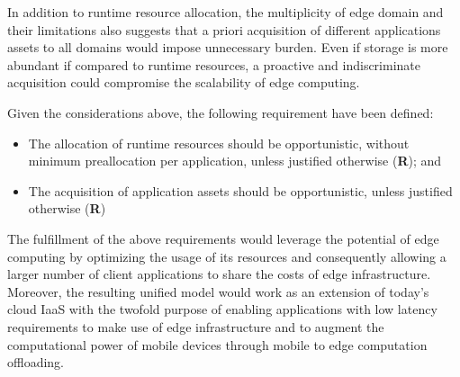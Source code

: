 In addition to runtime resource allocation, the multiplicity of edge domain and their limitations also suggests that a priori acquisition of different applications assets to all domains would impose unnecessary burden. Even if storage is more abundant if compared to runtime resources, a proactive and indiscriminate acquisition could compromise the scalability of edge computing.

\noindent Given the considerations above, 
the following requirement have been defined:

\begin{itemize}

	\item The allocation of runtime resources should be opportunistic, without minimum preallocation per application, unless justified otherwise (\textbf{R}); and
	
	\item The acquisition of application assets should be opportunistic, unless justified otherwise (\textbf{R})

\end{itemize} 

The fulfillment of the above requirements would leverage the potential of edge computing by optimizing the usage of its resources and consequently allowing a larger number of client applications to share the costs of edge infrastructure. Moreover, the resulting unified model would work as an extension of today’s cloud IaaS with the twofold purpose of enabling applications with low latency requirements to make use of edge infrastructure and to augment the computational power of mobile devices through mobile to edge computation offloading. 